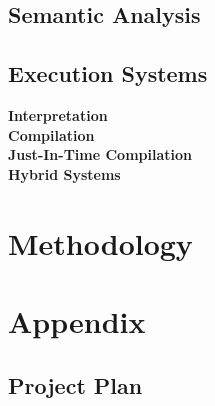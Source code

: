 \documentclass{article}
\begin{document}
\subsection{Semantic Analysis}
\subsection{Execution Systems}
\textbf{Interpretation \\}
\textbf{Compilation \\}
\textbf{Just-In-Time Compilation \\}
\textbf{Hybrid Systems \\}

\section{Methodology}

\section{Appendix}
\subsection{Project Plan}
\end{document}
